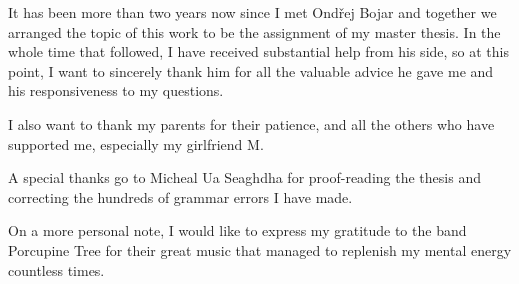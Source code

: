It has been more than two years now since I met Ondřej Bojar and together
we arranged the topic of this work to be the assignment of my master thesis.
In the whole time that followed, I have received substantial help
from his side, so at this point, I want to sincerely thank him for all the
valuable advice he gave me and his responsiveness to my questions.

I also want to thank my parents for their patience, and all the others who have
supported me, especially my girlfriend M.

A special thanks go to Micheal Ua Seaghdha for proof-reading the thesis and
correcting the hundreds of grammar errors I have made.

On a more personal note, I would like to express my gratitude to the band Porcupine Tree
for their great music that managed to replenish my mental energy countless times.
